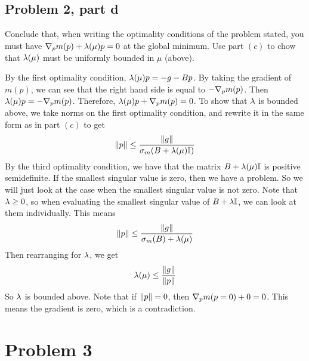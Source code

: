 \subsection{Problem 2, part d}
Conclude that, when writing the optimality conditions of the problem stated, you must have $\nabla_p m(p) + \mathrm{\lambda}(\mu)p = 0$ at the global minimum. Use part $(c)$ to chow that $\mathrm{\lambda}(\mu)$ must be uniformly bounded in $\mu$ (above).
\partbreak
\begin{solution}

    By the first optimality condition, $\mathrm{\lambda}(\mu)p = -g - Bp$. By taking the gradient of $m(p)$, we can see that the right hand side is equal to $-\nabla_p m(p)$. Then $\mathrm{\lambda}(\mu)p = -\nabla_p m(p)$. Therefore, $\mathrm{\lambda}(\mu)p + \nabla_p m(p)= 0$. To show that $\mathrm{\lambda}$ is bounded above, we take norms on the first optimality condition, and rewrite it in the same form as in part $(c)$ to get
    \[\norm{p} \leq \frac{\norm{g}}{\sigma_{m}(B + \mathrm{\lambda}(\mu)\mathbb{I} )}\]
    By the third optimality condition, we have that the matrix $B + \mathrm{\lambda}(\mu)\mathbb{I}$ is positive semidefinite. If the smallest singular value is zero, then we have a problem. So we will just look at the case when the smallest singular value is not zero. Note that $\mathrm{\lambda} \geq 0$, so when evaluating the smallest singular value of $B + \mathrm{\lambda} \mathbb{I}$, we can look at them individually. This means
    \[\norm{p} \leq \frac{\norm{g}}{\sigma_{m}(B) + \mathrm{\lambda}(\mu) }\]
    Then rearranging for $\mathrm{\lambda}$, we get
    \[\mathrm{\lambda}(\mu) \leq \frac{\norm{g}}{\norm{p}}\]
    So $\mathrm{\lambda}$ is bounded above. Note that if $\norm{p} = 0$, then $\nabla_p m(p = 0) + 0 = 0$. This means the gradient is zero, which is a contradiction.
\end{solution}



\newpage
\section{Problem 3}
